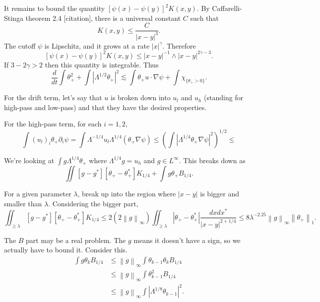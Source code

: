\documentclass[11pt]{amsart}
\theoremstyle{remark}
\newcommand{\eps}{\varepsilon}
\newcommand{\norm}[1]{\left\lVert#1\right\rVert}
\newcommand{\paren}[1]{\left( #1 \right)}
\newcommand{\abs}[1]{\left\lvert #1 \right\rvert}
\newcommand{\del}{\partial}
\newcommand{\grad}{\nabla}
\newcommand{\ddt}{\frac{d}{dt}}
\newcommand{\indic}[1]{\chi_{\{#1\}}}
\begin{document}
It remains to bound the quantity $[\psi(x)-\psi(y)]^2 K(x,y)$.  By Caffarelli-Stinga theorem 2.4 [citation], there is a universal constant $C$ such that
\[ K(x,y) \leq \frac{C}{|x-y|^{3}}. \]
The cutoff $\psi$ is Lipschitz, and it grows at a rate $|x|^\gamma$.  Therefore 
\[ [\psi(x)-\psi(y)]^2 K(x,y) \leq |x-y|^{-1} \wedge |x-y|^{2\gamma-3}. \]
If $3-2\gamma > 2$ then this quantity is integrable.  Thus
\[ \ddt \int \theta_+^2 + \int \abs{\Lambda^{1/2} \theta_+}^2 \lesssim \int \theta_+ u \cdot \grad \psi + \int \indic{\theta_+>0}.\]


For the drift term, let's say that $u$ is broken down into $u_l$ and $u_h$ (standing for high-pass and low-pass) and that they have the desired properties.  

For the high-pass term, for each $i = 1,2$,
\[ \int (u_l)_i \theta_+ \del_i \psi = \int \Lambda^{-1/4} u_l \Lambda^{1/4} (\theta_+ \grad \psi) \leq \paren{\int \abs{\Lambda^{1/4} \theta_+ \grad \psi}^2}^{1/2} \leq \]

We're looking at $\int g \Lambda^{1/4} \theta_+$ where $\Lambda^{1/4} g = u_h$ and $g \in L^\infty$.  This breaks down as
\[ \iint [g-g^*][\theta_+-\theta_+^*] K_{1/4} + \int g \theta_+ B_{1/4}. \]

For a given parameter $\lambda$, break up into the region where $|x-y|$ is bigger and smaller than $\lambda$.  Considering the bigger part,
\[ \iint_{\geq \lambda} [g-g^*][\theta_+ - \theta_+^*] K_{1/4} \leq 2 (2 \norm{g}_\infty) \iint_{\geq \lambda} |\theta_+ - \theta_+^*| \frac{dxdx^*}{|x-y|^{2+1/4}} \leq 8 \lambda^{-2.25} \norm{g}_\infty \norm{\theta_+}_1. \]

The $B$ part may be a real problem.  The $g$ means it doesn't have a sign, so we actually have to bound it.  Consider this.  
\begin{align*}
\int g \theta_k B_{1/4} &\leq \norm{g}_\infty \int \theta_{k-1} \theta_k B_{1/4}
\\ &\leq \norm{g}_\infty \int \theta_{k-1}^2 B_{1/4}
\\ &\leq \norm{g}_\infty \int \abs{\Lambda^{1/8} \theta_{k-1}}^2.
\end{align*} 
\end{document}
